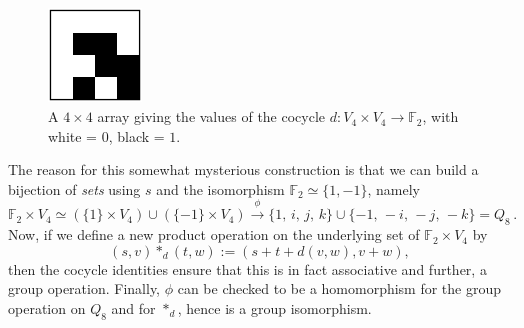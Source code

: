 \documentclass{article}
\theoremstyle{plain}
\theoremstyle{definition}
\def \FF {\mathbb{F}}
\begin{document}
\begin{figure}[!b]
\begin{center}
\includegraphics[height=2.5cm]{quaternion_cocyc} %
\end{center}
\caption{A $4\times4$ array giving the values of the cocycle $d\colon V_4\times V_4\to \FF_2$, with white = $0$, black = $1$.}
\label{fig:cocycle for q8}
\end{figure}


The reason for this somewhat mysterious construction is that we can build a bijection of \emph{sets} using $s$ and the isomorphism $\FF_2\simeq \{1,-1\}$, namely
\[
	\FF_2\times V_4 \simeq \left(\{1\}\times V_4\right) \cup \left(\{-1\} \times V_4\right) \stackrel{\phi}{\longrightarrow}
	\{1,\, i,\, j,\, k\}\cup \{-1,\, -i,\, -j,\, -k\} = Q_8\,.
\]
Now, if we define a new product operation on the underlying set of $\FF_2\times V_4$ by
\[
	(s,v)\ast_d(t,w):=(s+ t+ d(v,w),v+w),
\]
then the cocycle identities ensure that this is in fact associative and further, a group operation.
Finally, $\phi$ can be checked to be a homomorphism for the group operation on $Q_8$ and for $\ast_d$, hence is a group isomorphism.
\end{document}

